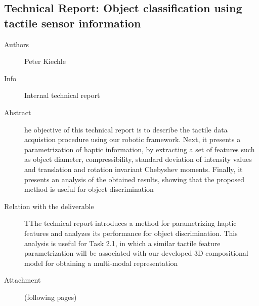 \documentclass[a4paper,11pt,pdf]{pacmanreport}
\begin{document}
\subsection{Technical Report: Object classification using tactile sensor information} \label{ann:techReportKiechle}
\begin{description}
\item[Authors] Peter Kiechle
\item[Info] Internal technical report
\item[Abstract] he objective of this technical report is to describe the 
tactile data acquistion procedure using our robotic framework. Next, it presents 
a parametrization of haptic information, by extracting a set of features such as 
object diameter, compressibility, standard deviation of intensity values and 
translation and rotation invariant Chebyshev moments. Finally, it presents an 
analysis of the obtained results, showing that the proposed method is useful for 
object discrimination
\item[Relation with the deliverable] TThe technical report introduces a method for parametrizing haptic features and 
analyzes its performance for object discrimination. This analysis is useful for 
Task 2.1, in which a similar tactile feature parametrization will be associated 
with our developed 3D compositional model for obtaining a multi-modal 
representation
\item[Attachment] (following pages)
\end{description}

\end{document}
